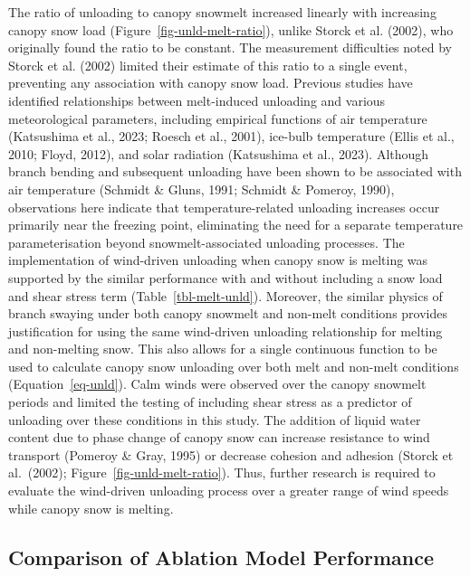 \documentclass[
]{agujournal2019}
\begin{document}
The ratio of unloading to canopy snowmelt increased linearly with
increasing canopy snow load (Figure~\ref{fig-unld-melt-ratio}), unlike
Storck et al. (2002), who originally found the ratio to be constant. The
measurement difficulties noted by Storck et al. (2002) limited their
estimate of this ratio to a single event, preventing any association
with canopy snow load. Previous studies have identified relationships
between melt-induced unloading and various meteorological parameters,
including empirical functions of air temperature (Katsushima et al.,
2023; Roesch et al., 2001), ice-bulb temperature (Ellis et al., 2010;
Floyd, 2012), and solar radiation (Katsushima et al., 2023). Although
branch bending and subsequent unloading have been shown to be associated
with air temperature (Schmidt \& Gluns, 1991; Schmidt \& Pomeroy, 1990),
observations here indicate that temperature-related unloading increases
occur primarily near the freezing point, eliminating the need for a
separate temperature parameterisation beyond snowmelt-associated
unloading processes. The implementation of wind-driven unloading when
canopy snow is melting was supported by the similar performance with and
without including a snow load and shear stress term
(Table~\ref{tbl-melt-unld}). Moreover, the similar physics of branch
swaying under both canopy snowmelt and non-melt conditions provides
justification for using the same wind-driven unloading relationship for
melting and non-melting snow. This also allows for a single continuous
function to be used to calculate canopy snow unloading over both melt
and non-melt conditions (Equation~\ref{eq-unld}). Calm winds were
observed over the canopy snowmelt periods and limited the testing of
including shear stress as a predictor of unloading over these conditions
in this study. The addition of liquid water content due to phase change
of canopy snow can increase resistance to wind transport (Pomeroy \&
Gray, 1995) or decrease cohesion and adhesion (Storck et al.~(2002);
Figure~\ref{fig-unld-melt-ratio}). Thus, further research is required to
evaluate the wind-driven unloading process over a greater range of wind
speeds while canopy snow is melting.

\subsection{Comparison of Ablation Model
Performance}\label{comparison-of-ablation-model-performance}
\end{document}
